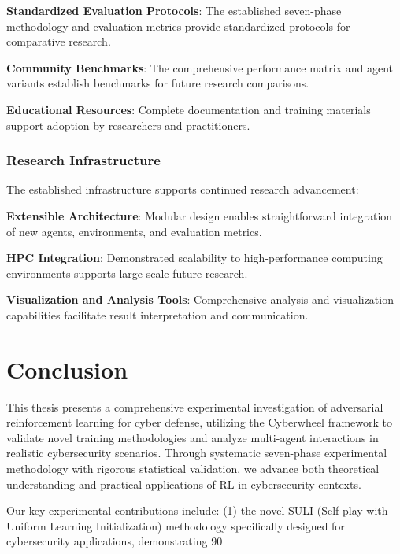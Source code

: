 \documentclass[11pt]{article}
\newcounter{phase}[algorithm]
\theoremstyle{definition}
\theoremstyle{plain}
\begin{document}
\textbf{Standardized Evaluation Protocols}: The established seven-phase methodology and evaluation metrics provide standardized protocols for comparative research.

\textbf{Community Benchmarks}: The comprehensive performance matrix and agent variants establish benchmarks for future research comparisons.

\textbf{Educational Resources}: Complete documentation and training materials support adoption by researchers and practitioners.

\subsubsection{Research Infrastructure}
The established infrastructure supports continued research advancement:

\textbf{Extensible Architecture}: Modular design enables straightforward integration of new agents, environments, and evaluation metrics.

\textbf{HPC Integration}: Demonstrated scalability to high-performance computing environments supports large-scale future research.

\textbf{Visualization and Analysis Tools}: Comprehensive analysis and visualization capabilities facilitate result interpretation and communication.

\section{Conclusion}

This thesis presents a comprehensive experimental investigation of adversarial reinforcement learning for cyber defense, utilizing the Cyberwheel framework to validate novel training methodologies and analyze multi-agent interactions in realistic cybersecurity scenarios. Through systematic seven-phase experimental methodology with rigorous statistical validation, we advance both theoretical understanding and practical applications of RL in cybersecurity contexts.

Our key experimental contributions include: (1) the novel SULI (Self-play with Uniform Learning Initialization) methodology specifically designed for cybersecurity applications, demonstrating 90%
\end{document}
